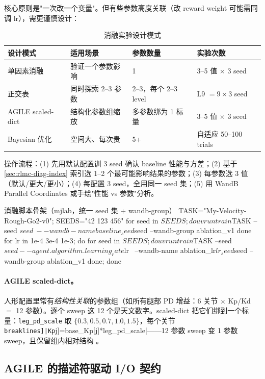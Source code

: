 核心原则是"一次改一个变量"。但有些参数高度关联（改 reward weight 可能需同调 lr），需更谨慎设计：

\begin{table}[H]
\centering
\caption{消融实验设计模式}
\label{tab:rlmc-diag-ablation}
\begin{tabular}{p{3.0cm}p{3.6cm}p{3.0cm}p{3.0cm}}
\hline
设计模式 & 适用场景 & 参数数量 & 实验次数 \\
\hline
单因素消融 & 验证一个参数影响 & 1 & 3--5 值 $\times$ 3 seed \\
正交表 & 同时探索 2--3 参数 & 2--3，每个 2--3 level & L9 $=9\times3$ seed \\
AGILE scaled-dict & 结构化参数组缩放 & 多参数绑为 1 标量 & 3--5 值 $\times$ 3 seed \\
Bayesian 优化 & 空间大、每次贵 & 5+ & 自适应 50--100 trials \\
\hline
\end{tabular}
\end{table}

操作流程：(1) 先用默认配置训 3 seed 确认 baseline 性能与方差；(2) 基于 \cref{sec:rlmc-diag-index} 索引选 1--2 个最可能影响结果的参数；(3) 每参数选 3 值（默认/更大/更小）；(4) 每配置 3 seed，全用同一 seed 集；(5) 用 WandB Parallel Coordinates 或手绘"性能 vs 参数"分析。

\begin{codebox}[bash]{消融脚本骨架（mjlab，统一 seed 集 + wandb-group）}
TASK="My-Velocity-Rough-Go2-v0"; SEEDS="42 123 456"
for seed in $SEEDS; do
  uv run train $TASK --seed $seed \
    --wandb-name baseline_seed${seed} --wandb-group ablation_v1
done
for lr in 1e-4 3e-4 1e-3; do for seed in $SEEDS; do
  uv run train $TASK --seed $seed --agent.algorithm.learning_rate $lr \
    --wandb-name ablation_lr${lr}_seed${seed} --wandb-group ablation_v1
done; done
\end{codebox}

\paragraph{AGILE scaled-dict。}人形配置里常有\emph{结构性关联}的参数组（如所有腿部 PD 增益：6 关节 $\times$ Kp/Kd $=$ 12 参数）。逐个 sweep 这 12 个是天文数字。scaled-dict 把它们绑到一个标量：\verb|leg_pd_scale| 取 $\{0.3,0.5,0.7,1.0,1.5\}$，每个关节 \Verb[breaklines]|Kp[j]=base_Kp[j]*leg_pd_scale|——12 参数 sweep 变 1 参数 sweep，且保留组内相对结构 \cite{nvidia2026agile}。

\subsection{AGILE 的描述符驱动 I/O 契约}

